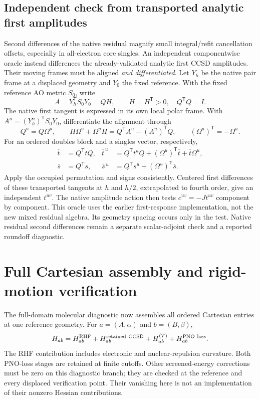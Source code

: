 \documentclass[11pt]{article}
\begin{document}
\subsection{Independent check from transported analytic first amplitudes}
Second differences of the native residual magnify small integral/refit
cancellation offsets, especially in all-electron core singles. An independent
componentwise oracle instead differences the already-validated analytic first
CCSD amplitudes. Their moving frames must be aligned \emph{and differentiated}.
Let $Y_h$ be the native pair frame at a displaced geometry and $Y_0$ the
fixed reference. With the fixed reference AO metric $S_0$, write
\begin{equation}
 A=Y_h^{\mathsf T}S_0Y_0=QH,\qquad
 H=H^{\mathsf T}>0,\quad Q^{\mathsf T}Q=I.
\end{equation}
The native first tangent is expressed in its own local polar frame. With
$A^u=(Y_h^u)^{\mathsf T}S_0Y_0$, differentiate the alignment through
\begin{equation}
 Q^u=Q\Omega^u,\qquad
 H\Omega^u+\Omega^u H=Q^{\mathsf T}A^u-(A^u)^{\mathsf T}Q,
 \qquad (\Omega^u)^{\mathsf T}=-\Omega^u.
\end{equation}
For an ordered doubles block and a singles vector, respectively,
\begin{align}
 \overline t&=Q^{\mathsf T}tQ,&
 \overline t^{\,u}&=Q^{\mathsf T}t^uQ
                    +(\Omega^u)^{\mathsf T}\overline t+\overline t\Omega^u,\\
 \overline s&=Q^{\mathsf T}s,&
 \overline s^{\,u}&=Q^{\mathsf T}s^u+(\Omega^u)^{\mathsf T}\overline s.
\end{align}
Apply the occupied permutation and signs consistently. Centered first
differences of these transported tangents at $h$ and $h/2$, extrapolated to
fourth order, give an independent $t^{uv}$. The native amplitude action then
tests $c^{uv}=-Jt^{uv}$ component by component. This oracle uses the earlier
first-response implementation, not the new mixed residual algebra. Its
geometry spacing occurs only in the test. Native residual second differences
remain a separate scalar-adjoint check and a reported roundoff diagnostic.

\section{Full Cartesian assembly and rigid-motion verification}
The full-domain molecular diagnostic now assembles all ordered Cartesian
entries at one reference geometry. For $a=(A,\alpha)$ and $b=(B,\beta)$,
\begin{equation}
 H_{ab}=H^{\rm RHF}_{ab}+H^{\rm retained\ CCSD}_{ab}
              +H^{(T)}_{ab}+H^{\rm PNO\ loss}_{ab}.
\end{equation}
The RHF contribution includes electronic and nuclear-repulsion curvature.
Both PNO-loss stages are retained at finite cutoffs. Other screened-energy
corrections must be zero on this diagnostic branch; they are checked at the
reference and every displaced verification point. Their vanishing here is
not an implementation of their nonzero Hessian contributions.
\end{document}

